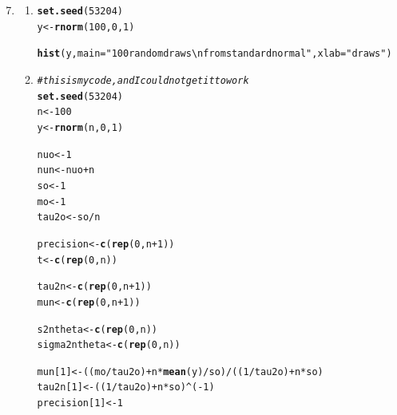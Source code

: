 \documentclass{article}\usepackage[]{graphicx}\usepackage[]{color}
\makeatletter
\newcommand{\hlnum}[1]{\textcolor[rgb]{0.686,0.059,0.569}{#1}}%
\newcommand{\hlstr}[1]{\textcolor[rgb]{0.192,0.494,0.8}{#1}}%
\newcommand{\hlcom}[1]{\textcolor[rgb]{0.678,0.584,0.686}{\textit{#1}}}%
\newcommand{\hlopt}[1]{\textcolor[rgb]{0,0,0}{#1}}%
\newcommand{\hlstd}[1]{\textcolor[rgb]{0.345,0.345,0.345}{#1}}%
\newcommand{\hlkwb}[1]{\textcolor[rgb]{0.69,0.353,0.396}{#1}}%
\newcommand{\hlkwc}[1]{\textcolor[rgb]{0.333,0.667,0.333}{#1}}%
\newcommand{\hlkwd}[1]{\textcolor[rgb]{0.737,0.353,0.396}{\textbf{#1}}}%
\newenvironment{kframe}{%
 \def\at@end@of@kframe{}%
 \ifinner\ifhmode%
  \def\at@end@of@kframe{\end{minipage}}%
  \begin{minipage}{\columnwidth}%
 \fi\fi%
 \def\FrameCommand##1{\hskip\@totalleftmargin \hskip-\fboxsep
 \colorbox{shadecolor}{##1}\hskip-\fboxsep
     \hskip-\linewidth \hskip-\@totalleftmargin \hskip\columnwidth}%
 \MakeFramed {\advance\hsize-\width
   \@totalleftmargin\z@ \linewidth\hsize
   \@setminipage}}%
 {\par\unskip\endMakeFramed%
 \at@end@of@kframe}
\newenvironment{knitrout}{}{} %
\makeatother
\begin{document}
\begin{enumerate}

\setcounter{enumi}{6}
\item%
\begin{enumerate}
\item%
\begin{knitrout}
\color{fgcolor}\begin{kframe}
\begin{alltt}
\hlkwd{set.seed}\hlstd{(}\hlnum{53204}\hlstd{)}
\hlstd{y} \hlkwb{<-} \hlkwd{rnorm}\hlstd{(}\hlnum{100}\hlstd{,}\hlnum{0}\hlstd{,}\hlnum{1}\hlstd{)}

\hlkwd{hist}\hlstd{(y,} \hlkwc{main} \hlstd{=} \hlstr{"100 random draws \textbackslash{}n from standard normal"}\hlstd{,} \hlkwc{xlab} \hlstd{=} \hlstr{"draws"}\hlstd{)}
\end{alltt}
\end{kframe}
\end{knitrout}
\addtocounter{enumii}{1}
\item %
\begin{knitrout}
\color{fgcolor}\begin{kframe}
\begin{alltt}
\hlcom{# this is my code, and I could not get it to work}
\hlkwd{set.seed}\hlstd{(}\hlnum{53204}\hlstd{)}
\hlstd{n} \hlkwb{<-} \hlnum{100}
\hlstd{y} \hlkwb{<-} \hlkwd{rnorm}\hlstd{(n,}\hlnum{0}\hlstd{,}\hlnum{1}\hlstd{)}

\hlstd{nuo} \hlkwb{<-} \hlnum{1}
\hlstd{nun} \hlkwb{<-} \hlstd{nuo} \hlopt{+} \hlstd{n}
\hlstd{so} \hlkwb{<-} \hlnum{1}
\hlstd{mo} \hlkwb{<-} \hlnum{1}
\hlstd{tau2o} \hlkwb{<-} \hlstd{so}\hlopt{/}\hlstd{n}


\hlstd{precision} \hlkwb{<-} \hlkwd{c}\hlstd{(}\hlkwd{rep}\hlstd{(}\hlnum{0}\hlstd{,n}\hlopt{+}\hlnum{1}\hlstd{))}
\hlstd{t} \hlkwb{<-} \hlkwd{c}\hlstd{(}\hlkwd{rep}\hlstd{(}\hlnum{0}\hlstd{,n))}

\hlstd{tau2n} \hlkwb{<-} \hlkwd{c}\hlstd{(}\hlkwd{rep}\hlstd{(}\hlnum{0}\hlstd{,n}\hlopt{+}\hlnum{1}\hlstd{))}
\hlstd{mun} \hlkwb{<-} \hlkwd{c}\hlstd{(}\hlkwd{rep}\hlstd{(}\hlnum{0}\hlstd{,n}\hlopt{+}\hlnum{1}\hlstd{))}

\hlstd{s2ntheta} \hlkwb{<-} \hlkwd{c}\hlstd{(}\hlkwd{rep}\hlstd{(}\hlnum{0}\hlstd{,n))}
\hlstd{sigma2ntheta} \hlkwb{<-} \hlkwd{c}\hlstd{(}\hlkwd{rep}\hlstd{(}\hlnum{0}\hlstd{,n))}

\hlstd{mun[}\hlnum{1}\hlstd{]} \hlkwb{<-} \hlstd{((mo}\hlopt{/}\hlstd{tau2o)} \hlopt{+} \hlstd{n}\hlopt{*}\hlkwd{mean}\hlstd{(y)}\hlopt{/}\hlstd{so)}\hlopt{/}\hlstd{((}\hlnum{1}\hlopt{/}\hlstd{tau2o)} \hlopt{+} \hlstd{n}\hlopt{*}\hlstd{so)}
\hlstd{tau2n[}\hlnum{1}\hlstd{]} \hlkwb{<-} \hlstd{((}\hlnum{1}\hlopt{/}\hlstd{tau2o)} \hlopt{+} \hlstd{n}\hlopt{*}\hlstd{so)}\hlopt{^}\hlstd{(}\hlopt{-}\hlnum{1}\hlstd{)}
\hlstd{precision[}\hlnum{1}\hlstd{]} \hlkwb{<-} \hlnum{1}



\end{alltt}
\end{kframe}
\end{knitrout}
\end{enumerate}
\end{enumerate}
\end{document}
